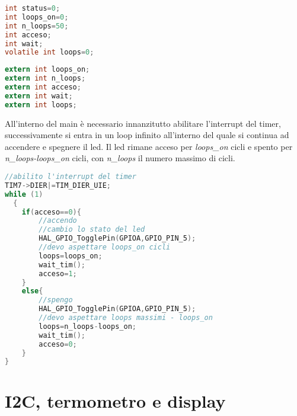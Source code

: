 \documentclass[main.tex]{subfiles}
\begin{document}
\begin{lstlisting}[language=C, caption=Variabili globali interrupt]
int status=0;
int loops_on=0;
int n_loops=50;
int acceso;
int wait;
volatile int loops=0;
\end{lstlisting}

\begin{lstlisting}[language=C,caption=Variabili globali main]
extern int loops_on;
extern int n_loops;
extern int acceso;
extern int wait;
extern int loops;
\end{lstlisting}
All'interno del main è necessario innanzitutto abilitare l'interrupt del timer, successivamente si entra in un loop infinito all'interno del quale si continua ad accendere e spegnere il led. Il led rimane acceso per \textit{loops\_on} cicli e spento per \textit{n\_loops-loops\_on} cicli, con \textit{n\_loops} il numero massimo di cicli. 

\begin{lstlisting}[language=C,caption=Main]
//abilito l'interrupt del timer
TIM7->DIER|=TIM_DIER_UIE;
while (1)
  {
	if(acceso==0){
		//accendo
		//cambio lo stato del led
		HAL_GPIO_TogglePin(GPIOA,GPIO_PIN_5);
		//devo aspettare loops_on cicli
		loops=loops_on;
		wait_tim();
		acceso=1;
	}
	else{
		//spengo
		HAL_GPIO_TogglePin(GPIOA,GPIO_PIN_5);
		//devo aspettare loops massimi - loops_on
		loops=n_loops-loops_on;
		wait_tim();
		acceso=0;
	}
}
\end{lstlisting}
\section{I2C, termometro e display}
\end{document}
